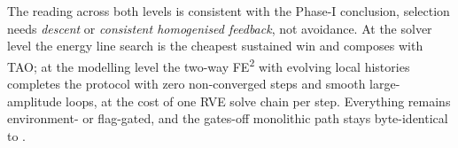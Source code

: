The reading across both levels is consistent with the Phase-I
conclusion, selection needs \emph{descent} or \emph{consistent
homogenised feedback}, not avoidance. At the solver level the energy
line search is the cheapest sustained win and composes with TAO; at the
modelling level the two-way FE\textsuperscript{2} with evolving local
histories completes the protocol with zero non-converged steps and
smooth large-amplitude loops, at the cost of one RVE solve chain per
step. Everything remains environment- or flag-gated, and the gates-off
monolithic path stays byte-identical to .
